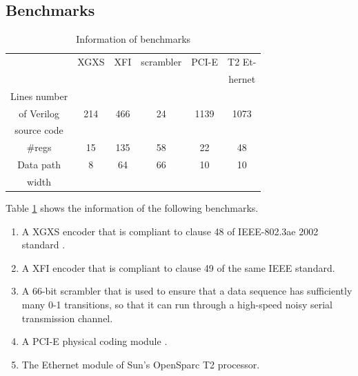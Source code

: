 \documentclass[journal]{IEEEtran}
\begin{document}
\subsection{Benchmarks}
\begin{table}[t]
\centering
\caption{Information of benchmarks}
\begin{tabular}{|c|c|c|c|c|c|}
\hline
&XGXS&XFI&scrambler&PCI-E&T2 Et-\\
&&&&&hernet\\\hline
Lines number&&&&&\\
of Verilog&214&466&24&1139&1073\\
source code&&&&&\\\hline
\#regs&15&135&58&22&48\\\hline
Data path&8&64&66&10&10\\
width&&&&&\\ \hline
\end{tabular}\label{tab_info}
\end{table}


Table \ref{tab_info} shows the information of the following benchmarks.
\begin{enumerate}

\item A XGXS encoder that is compliant to clause 48 of IEEE-802.3ae 2002 standard \cite{IEEE80232002}.

\item A XFI encoder that is compliant to clause 49 of the same IEEE standard.

\item A 66-bit scrambler that is used to ensure
that a data sequence has sufficiently many 0-1 transitions,
so that it can run through a high-speed
noisy serial transmission channel.

\item A PCI-E physical coding module \cite{PCIESPEC}.

\item The Ethernet module of Sun's OpenSparc T2 processor.
\end{enumerate}
\end{document}
